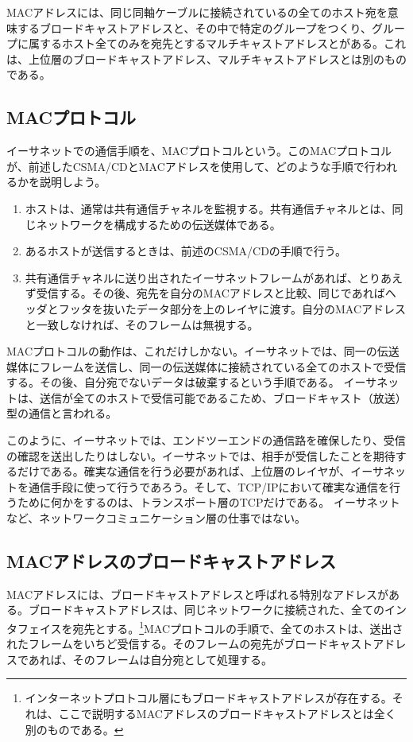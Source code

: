 MACアドレスには、同じ同軸ケーブルに接続されているの全てのホスト宛を意味するブロードキャストアドレスと、その中で特定のグループをつくり、グループに属するホスト全てのみを宛先とするマルチキャストアドレスとがある。これは、上位層のブロードキャストアドレス、マルチキャストアドレスとは別のものである。

\subsection{MACプロトコル}

イーサネットでの通信手順を、MACプロトコルという。このMACプロトコルが、前述したCSMA/CDとMACアドレスを使用して、どのような手順で行われるかを説明しよう。
\begin{enumerate}
\item ホストは、通常は共有通信チャネルを監視する。共有通信チャネルとは、同じネットワークを構成するための伝送媒体である。
\item あるホストが送信するときは、前述のCSMA/CDの手順で行う。
\item 共有通信チャネルに送り出されたイーサネットフレームがあれば、とりあえず受信する。その後、宛先を自分のMACアドレスと比較、同じであればヘッダとフッタを抜いたデータ部分を上のレイヤに渡す。自分のMACアドレスと一致しなければ、そのフレームは無視する。
\end{enumerate}

MACプロトコルの動作は、これだけしかない。イーサネットでは、同一の伝送媒体にフレームを送信し、同一の伝送媒体に接続されている全てのホストで受信する。その後、自分宛でないデータは破棄するという手順である。
イーサネットは、送信が全てのホストで受信可能であるこため、ブロードキャスト（放送）型の通信と言われる。

このように、イーサネットでは、エンドツーエンドの通信路を確保したり、受信の確認を送出したりはしない。イーサネットでは、相手が受信したことを期待するだけである。確実な通信を行う必要があれば、上位層のレイヤが、イーサネットを通信手段に使って行うであろう。そして、TCP/IPにおいて確実な通信を行うために何かをするのは、トランスポート層のTCPだけである。
イーサネットなど、ネットワークコミュニケーション層の仕事ではない。


\subsection{MACアドレスのブロードキャストアドレス}

MACアドレスには、ブロードキャストアドレスと呼ばれる特別なアドレスがある。ブロードキャストアドレスは、同じネットワークに接続された、全てのインタフェイスを宛先とする。\footnote{インターネットプロトコル層にもブロードキャストアドレスが存在する。それは、ここで説明するMACアドレスのブロードキャストアドレスとは全く別のものである。}MACプロトコルの手順で、全てのホストは、送出されたフレームをいちど受信する。そのフレームの宛先がブロードキャストアドレスであれば、そのフレームは自分宛として処理する。

